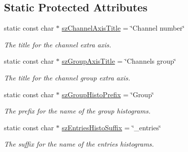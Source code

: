 \subsection*{Static Protected Attributes}
\begin{DoxyCompactItemize}
\item 
\mbox{\label{classQn_1_1CorrectionHistogramBase_a2a12dd507360d982bf37c1961fa6edb9}} 
static const char $\ast$ \mbox{\hyperlink{classQn_1_1CorrectionHistogramBase_a2a12dd507360d982bf37c1961fa6edb9}{sz\+Channel\+Axis\+Title}} = \char`\"{}Channel number\char`\"{}
\begin{DoxyCompactList}\small\item\em The title for the channel extra axis. \end{DoxyCompactList}\item 
\mbox{\label{classQn_1_1CorrectionHistogramBase_ac99c60b1cd9aa197a9c92775923748a8}} 
static const char $\ast$ \mbox{\hyperlink{classQn_1_1CorrectionHistogramBase_ac99c60b1cd9aa197a9c92775923748a8}{sz\+Group\+Axis\+Title}} = \char`\"{}Channels group\char`\"{}
\begin{DoxyCompactList}\small\item\em The title for the channel group extra axis. \end{DoxyCompactList}\item 
\mbox{\label{classQn_1_1CorrectionHistogramBase_a40d6fa9f5f3f29647e80e7e69ec0634a}} 
static const char $\ast$ \mbox{\hyperlink{classQn_1_1CorrectionHistogramBase_a40d6fa9f5f3f29647e80e7e69ec0634a}{sz\+Group\+Histo\+Prefix}} = \char`\"{}Group\char`\"{}
\begin{DoxyCompactList}\small\item\em The prefix for the name of the group histograms. \end{DoxyCompactList}\item 
\mbox{\label{classQn_1_1CorrectionHistogramBase_a3aaf5a04908df6b0a3d1eff06be0630f}} 
static const char $\ast$ \mbox{\hyperlink{classQn_1_1CorrectionHistogramBase_a3aaf5a04908df6b0a3d1eff06be0630f}{sz\+Entries\+Histo\+Suffix}} = \char`\"{}\+\_\+entries\char`\"{}
\begin{DoxyCompactList}\small\item\em The suffix for the name of the entries histograms. \end{DoxyCompactList}\item 

\end{DoxyCompactItemize}
